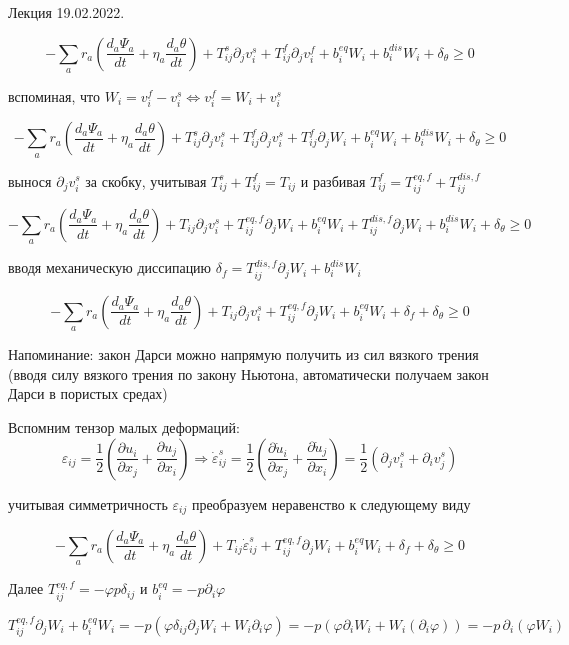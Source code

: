\documentclass[main.tex]{subfiles}
\begin{document}
Лекция 19.02.2022.

$$-\sum\limits_a{r_a\left(\frac{d_a\Psi_a}{dt}+\eta_a\frac{d_a\theta}{dt}\right)}+T_{ij}^s\partial_jv_i^s+T_{ij}^f\partial_jv_i^f+b_i^{eq}W_i+b_i^{dis}W_i+\delta_\theta\geq 0$$

вспоминая, что $W_i=v_i^f-v_i^s\Leftrightarrow v_i^f=W_i+v_i^s$

$$-\sum\limits_a{r_a\left(\frac{d_a\Psi_a}{dt}+\eta_a\frac{d_a\theta}{dt}\right)}+T_{ij}^s\partial_jv_i^s+T_{ij}^f\partial_jv_i^s+T_{ij}^f\partial_j W_i+b_i^{eq}W_i+b_i^{dis}W_i+\delta_\theta\geq 0$$

вынося $\partial_jv_i^s$ за скобку, учитывая $T_{ij}^s+T_{ij}^f=T_{ij}$ и разбивая $T_{ij}^f=T_{ij}^{eq,f}+T_{ij}^{dis,f}$

$$-\sum\limits_a{r_a\left(\frac{d_a\Psi_a}{dt}+\eta_a\frac{d_a\theta}{dt}\right)}+T_{ij}\partial_jv_i^s+T_{ij}^{eq,f}\partial_j W_i+b_i^{eq}W_i+T_{ij}^{dis,f}\partial_j W_i+b_i^{dis}W_i+\delta_\theta\geq 0$$

вводя механическую диссипацию $\delta_f=T_{ij}^{dis,f}\partial_j W_i+b_i^{dis}W_i$

$$-\sum\limits_a{r_a\left(\frac{d_a\Psi_a}{dt}+\eta_a\frac{d_a\theta}{dt}\right)}+T_{ij}\partial_jv_i^s+T_{ij}^{eq,f}\partial_j W_i+b_i^{eq}W_i+\delta_f+\delta_\theta\geq 0$$

Напоминание: закон Дарси можно напрямую получить из сил вязкого трения (вводя силу вязкого трения по закону Ньютона, автоматически получаем закон Дарси в пористых средах)

Вспомним тензор малых деформаций: $$\varepsilon_{ij}=\frac{1}{2}\left(\frac{\partial u_i}{\partial x_j}+\frac{\partial u_j}{\partial x_i}\right)\Rightarrow \dot{\varepsilon}_{ij}^s=\frac{1}{2}\left(\frac{\partial\dot{u}_i}{\partial x_j}+\frac{\partial\dot{u}_j}{\partial x_i}\right)=\frac{1}{2}\left(\partial_jv_i^s+\partial_iv_j^s\right)$$

учитывая симметричность $\varepsilon_{ij}$ преобразуем неравенство к следующему виду

$$-\sum\limits_a{r_a\left(\frac{d_a\Psi_a}{dt}+\eta_a\frac{d_a\theta}{dt}\right)}+T_{ij}\dot{\varepsilon}_{ij}^s+T_{ij}^{eq,f}\partial_j W_i+b_i^{eq}W_i+\delta_f+\delta_\theta\geq 0$$

Далее $T_{ij}^{eq,f}=-\varphi p\delta_{ij}$ и $b_i^{eq}=-p\partial_i\varphi$

$$T_{ij}^{eq,f}\partial_j W_i+b_i^{eq}W_i=-p\left(\varphi\delta_{ij}\partial_j W_i+W_i\partial_i\varphi\right)=-p\left(\varphi\partial_i W_i+W_i\left(\partial_i\varphi\right)\right)=-p\,\partial_i\!\left(\varphi W_i\right)$$
\end{document}
